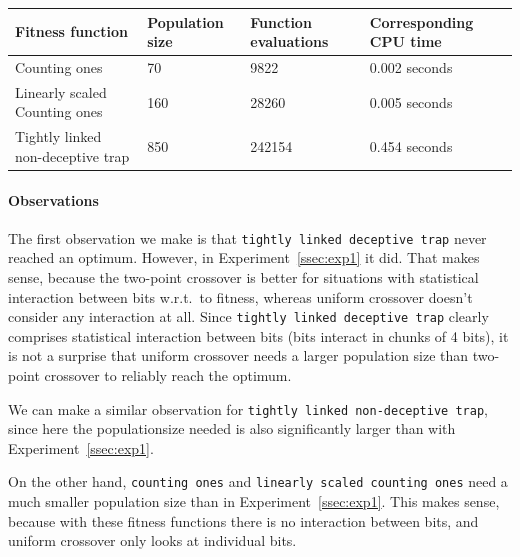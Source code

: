 \documentclass[12pt]{article}
\theoremstyle{definition}
\newcommand{\co}{\texttt{counting ones}}
\newcommand{\lsco}{\texttt{linearly scaled counting ones}}
\newcommand{\tdt}{\texttt{tightly linked deceptive trap}}
\newcommand{\tnt}{\texttt{tightly linked non-deceptive trap}}
\begin{document}
\begin{table}[!htb]
\begin{adjustwidth}{0cm}{}
\centering
\begin{tabular}{lp{2.5cm}p{2.5cm}p{2.8cm}}
\toprule[1.5pt]
\bf Fitness function & \bf Population size & \bf Function evaluations & \bf Corresponding CPU time\\\midrule
Counting ones & 70 & 9822 & 0.002 seconds \\
Linearly scaled Counting ones & 160 & 28260 & 0.005 seconds \\
Tightly linked non-deceptive trap & 850 & 242154 & 0.454 seconds \\
\bottomrule[1.25pt]
\end{tabular}\par
\bigskip
{}
\label{tab:exp2}
\end{adjustwidth}
\end{table}

\paragraph{Observations}
The first observation we make is that \tdt{} never reached an optimum.
However, in Experiment~\ref{ssec:exp1} it did.
That makes sense, because the two-point crossover is better for situations with
statistical interaction between bits w.r.t.\ to fitness, whereas uniform crossover doesn't
consider any interaction at all.
Since \tdt{} clearly comprises statistical interaction between bits (bits interact in chunks
of 4 bits), it is not a surprise that uniform crossover needs a larger population size than
two-point crossover to reliably reach the optimum.

We can make a similar observation for \tnt{}, since here the populationsize needed is also
significantly larger than with Experiment~\ref{ssec:exp1}.

On the other hand, \co{} and \lsco{} need a much smaller population size than in
Experiment~\ref{ssec:exp1}.
This makes sense, because with these fitness functions there is no interaction between bits,
and uniform crossover only looks at individual bits.
\end{document}

